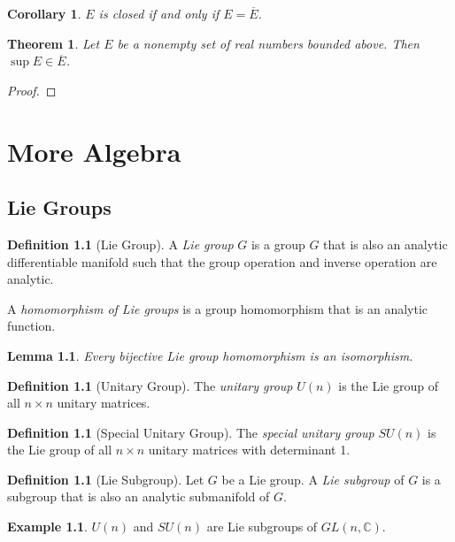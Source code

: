 \documentclass{book}
\let\qed\relax
\newtheorem{cor}{Corollary}[prop]
\newtheorem{thm}[prop]{Theorem}
\newtheorem{lm}[prop]{Lemma}
\theoremstyle{definition}
\newtheorem{df}[prop]{Definition}
\newtheorem{ex}[prop]{Example}
\begin{document}
\begin{cor}
$E$ is closed if and only if $E = \overline{E}$.
\end{cor}

\begin{thm}
Let $E$ be a nonempty set of real numbers bounded above. Then $\sup E \in \overline{E}$.
\end{thm}

\begin{proof}
\pf
{}
\qed
\end{proof}

\part{More Algebra}

\chapter{Lie Groups}

\begin{df}[Lie Group]
A \emph{Lie group} $G$ is a group $G$ that is also an analytic differentiable manifold such that the group operation and inverse operation are analytic.

A \emph{homomorphism of Lie groups} is a group homomorphism that is an analytic function.
\end{df}

\begin{lm}
Every bijective Lie group homomorphism is an isomorphism.
\end{lm}


\begin{df}[Unitary Group]
The \emph{unitary group} $U(n)$ is the Lie group of all $n \times n$ unitary matrices.
\end{df}

\begin{df}[Special Unitary Group]
The \emph{special unitary group} $SU(n)$ is the Lie group of all $n \times n$ unitary matrices with determinant 1.
\end{df}

\begin{df}[Lie Subgroup]
Let $G$ be a Lie group. A \emph{Lie subgroup} of $G$ is a subgroup that is also an analytic submanifold of $G$.
\end{df}

\begin{ex}
$U(n)$ and $SU(n)$ are Lie subgroups of $GL(n, \mathbb{C})$.
\end{ex}
\end{document}
